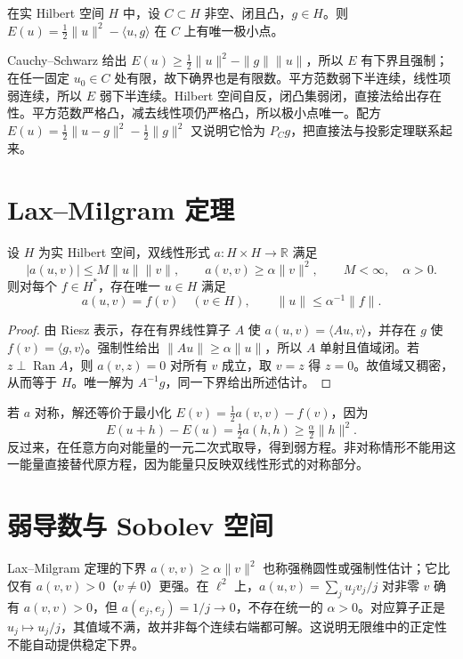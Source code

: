 \documentclass[UTF8,12pt,a4paper,fontset=fandol]{ctexbook}
\begin{document}
\begin{example}[直接法的完整使用]
在实 Hilbert 空间 $H$ 中，设 $C\subset H$ 非空、闭且凸，$g\in H$。则 $E(u)=\frac12\|u\|^2-\langle u,g\rangle$ 在 $C$ 上有唯一极小点。
\end{example}
\begin{solve}
Cauchy--Schwarz 给出 $E(u)\geq\frac12\|u\|^2-\|g\|\|u\|$，所以 $E$ 有下界且强制；在任一固定 $u_0\in C$ 处有限，故下确界也是有限数。平方范数弱下半连续，线性项弱连续，所以 $E$ 弱下半连续。Hilbert 空间自反，闭凸集弱闭，直接法给出存在性。平方范数严格凸，减去线性项仍严格凸，所以极小点唯一。配方 $E(u)=\frac12\|u-g\|^2-\frac12\|g\|^2$ 又说明它恰为 $P_Cg$，把直接法与投影定理联系起来。
\end{solve}

\section{Lax--Milgram 定理}
\begin{theorem}\label{thm:fa-lax-milgram}
设 $H$ 为实 Hilbert 空间，双线性形式 $a:H\times H\to\mathbb R$ 满足
\[
 |a(u,v)|\leq M\|u\|\|v\|,\qquad
 a(v,v)\geq\alpha\|v\|^2,
 \qquad M<\infty,\quad\alpha>0.
\]
则对每个 $f\in H^*$，存在唯一 $u\in H$ 满足
\begin{equation}
 a(u,v)=f(v)\quad(v\in H),\qquad
 \|u\|\leq\alpha^{-1}\|f\|.
 \label{eq:fa-lax-milgram}
\end{equation}
\end{theorem}
\begin{proof}
由 Riesz 表示，存在有界线性算子 $A$ 使 $a(u,v)=\langle Au,v\rangle$，并存在 $g$ 使 $f(v)=\langle g,v\rangle$。强制性给出 $\|Au\|\geq\alpha\|u\|$，所以 $A$ 单射且值域闭。若 $z\perp\operatorname{Ran}A$，则 $a(v,z)=0$ 对所有 $v$ 成立，取 $v=z$ 得 $z=0$。故值域又稠密，从而等于 $H$。唯一解为 $A^{-1}g$，同一下界给出所述估计。
\end{proof}
若 $a$ 对称，解还等价于最小化 $E(v)=\frac12a(v,v)-f(v)$，因为
\[
 E(u+h)-E(u)=\tfrac12a(h,h)\geq\tfrac\alpha2\|h\|^2.
\]
反过来，在任意方向对能量的一元二次式取导，得到弱方程。非对称情形不能用这一能量直接替代原方程，因为能量只反映双线性形式的对称部分。

\section{弱导数与 Sobolev 空间}
Lax--Milgram 定理的下界 $a(v,v)\geq\alpha\|v\|^2$ 也称强椭圆性或强制性估计；它比仅有 $a(v,v)>0$（$v\ne0$）更强。在 $\ell^2$ 上，$a(u,v)=\sum_ju_jv_j/j$ 对非零 $v$ 确有 $a(v,v)>0$，但 $a(e_j,e_j)=1/j\to0$，不存在统一的 $\alpha>0$。对应算子正是 $u_j\mapsto u_j/j$，其值域不满，故并非每个连续右端都可解。这说明无限维中的正定性不能自动提供稳定下界。
\end{document}
